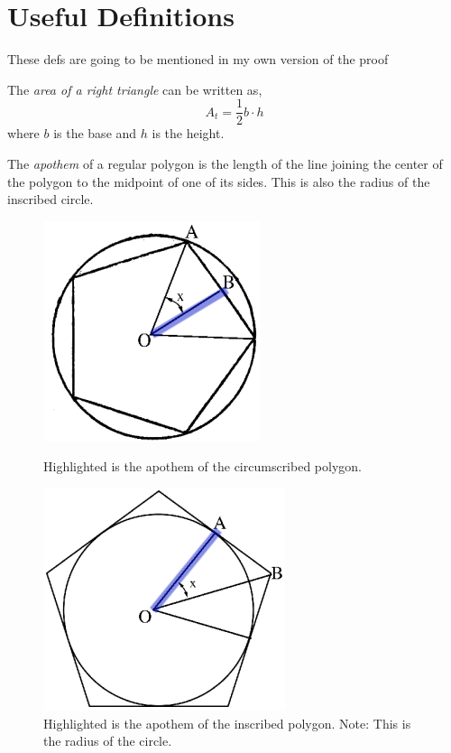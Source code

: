 \documentclass{article}
\begin{document}
\section{Useful Definitions}
\textcolor{Periwinkle}{These defs are going to be mentioned in my own version of the proof}
\begin{definition}\label{def:TriArea}
The \textit{area of a right triangle} can be written as,\\
\[A_t = \frac{1}{2} b\cdot h\]
where $b$ is the base and $h$ is the height.
\end{definition}

\begin{definition}\label{def:apoth}
The \textit{apothem} of a regular polygon is the length of the line joining the center of the polygon to the midpoint of one of its sides. This is also the radius of the inscribed circle.\\

\begin{figure}[H]
    \centering
    \begin{minipage}{0.4\textwidth}
        \centering
        \includegraphics[width=0.5\linewidth]{circumscribed_apothem.png}
        \caption{Highlighted is the apothem of the circumscribed polygon.}
    \end{minipage}
    \hfill
    \begin{minipage}{0.45\textwidth}
        \centering
        \includegraphics[width=0.5\linewidth]{inscribed_apothem.png}
        \caption{Highlighted is the apothem of the inscribed polygon. Note: This is the radius of the circle.}
    \end{minipage}
\end{figure}

\end{definition}
\end{document}
